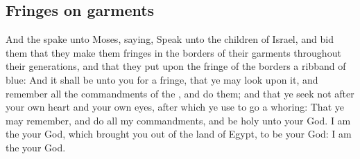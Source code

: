 \begin{biblechapter}
\section*{Fringes on garments}
\verse And the \LORD spake unto Moses, saying,
\verse Speak unto the children of Israel, and bid them that they make them fringes in the borders of their garments throughout their generations, and that they put upon the fringe of the borders a ribband of blue:
\verse And it shall be unto you for a fringe, that ye may look upon it, and remember all the commandments of the \LORD, and do them; and that ye seek not after your own heart and your own eyes, after which ye use to go a whoring:
\verse That ye may remember, and do all my commandments, and be holy unto your God.
\verse I am the \LORD your God, which brought you out of the land of Egypt, to be your God: I am the \LORD your God.
\end{biblechapter}

